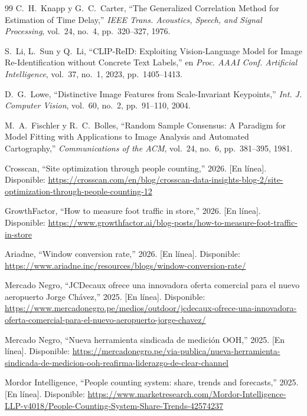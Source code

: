 \documentclass[12pt,a4paper]{article}
\begin{document}
\begin{thebibliography}{99}
C.~H.~Knapp y G.~C.~Carter, ``The Generalized Correlation Method for
Estimation of Time Delay,'' \textit{IEEE Trans. Acoustics, Speech, and
Signal Processing}, vol.~24, no.~4, pp.~320--327, 1976.

S.~Li, L.~Sun y Q.~Li, ``CLIP-ReID: Exploiting Vision-Language Model for
Image Re-Identification without Concrete Text Labels,'' en \textit{Proc.
AAAI Conf. Artificial Intelligence}, vol.~37, no.~1, 2023,
pp.~1405--1413.

D.~G.~Lowe, ``Distinctive Image Features from Scale-Invariant Keypoints,''
\textit{Int. J. Computer Vision}, vol.~60, no.~2, pp.~91--110, 2004.

M.~A.~Fischler y R.~C.~Bolles, ``Random Sample Consensus: A Paradigm for Model
Fitting with Applications to Image Analysis and Automated Cartography,''
\textit{Communications of the ACM}, vol.~24, no.~6, pp.~381--395, 1981.

Crosscan, ``Site optimization through people counting,'' 2026. [En línea].
Disponible:
\url{https://crosscan.com/en/blog/crosscan-data-insights-blog-2/site-optimization-through-people-counting-12}

GrowthFactor, ``How to measure foot traffic in store,'' 2026. [En línea].
Disponible:
\url{https://www.growthfactor.ai/blog-posts/how-to-measure-foot-traffic-in-store}

Ariadne, ``Window conversion rate,'' 2026. [En línea]. Disponible:
\url{https://www.ariadne.inc/resources/blogs/window-conversion-rate/}

Mercado Negro, ``JCDecaux ofrece una innovadora oferta comercial para el nuevo
aeropuerto Jorge Chávez,'' 2025. [En línea]. Disponible:
\url{https://www.mercadonegro.pe/medios/outdoor/jcdecaux-ofrece-una-innovadora-oferta-comercial-para-el-nuevo-aeropuerto-jorge-chavez/}

Mercado Negro, ``Nueva herramienta sindicada de medición OOH,'' 2025. [En
línea]. Disponible:
\url{https://mercadonegro.pe/via-publica/nueva-herramienta-sindicada-de-medicion-ooh-reafirma-liderazgo-de-clear-channel}

Mordor Intelligence, ``People counting system: share, trends and forecasts,''
2025. [En línea]. Disponible:
\url{https://www.marketresearch.com/Mordor-Intelligence-LLP-v4018/People-Counting-System-Share-Trends-42574237}


\end{thebibliography}
\end{document}
